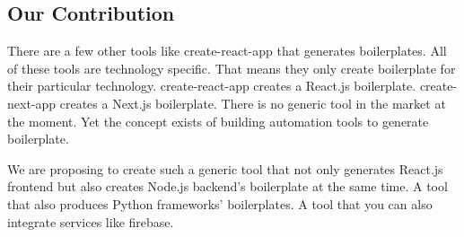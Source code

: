 \subsection{Our Contribution}

There are a few other tools like create-react-app that generates boilerplates. All of these tools are technology specific. That means they only create boilerplate for their particular technology. create-react-app creates a React.js boilerplate. create-next-app creates a Next.js boilerplate. There is no generic tool in the market at the moment. Yet the concept exists of building automation tools to generate boilerplate.

We are proposing to create such a generic tool that not only generates React.js frontend but also creates Node.js backend’s boilerplate at the same time. A tool that also produces Python frameworks’ boilerplates. A tool that you can also integrate services like firebase.

